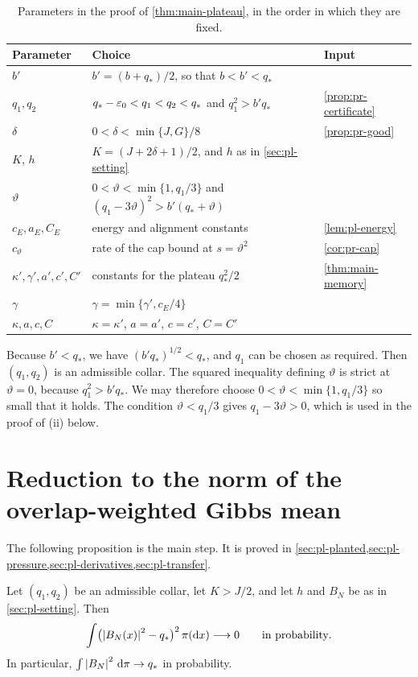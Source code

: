 \begin{table}[ht]
\centering
\small
\caption{Parameters in the proof of \cref{thm:main-plateau}, in the order in which they are fixed.}\label{tab:pl-parameters}
\begin{tabular}{@{}l l l@{}}
\toprule
Parameter & Choice & Input\\
\midrule
$b'$ & $b'=(b+q_*)/2$, so that $b<b'<q_*$ & \\
$q_1,q_2$ & $q_*-\varepsilon_0<q_1<q_2<q_*$ and $q_1^2>b'q_*$ & \cref{prop:pr-certificate}\\
$\delta$ & $0<\delta<\min\{J,G\}/8$ & \cref{prop:pr-good}\\
$K$, $h$ & $K=(J+2\delta+1)/2$, and $h$ as in \cref{sec:pl-setting} & \\
$\vartheta$ & $0<\vartheta<\min\{1,q_1/3\}$ and $(q_1-3\vartheta)^2>b'(q_*+\vartheta)$ & \\
$c_E,a_E,C_E$ & energy and alignment constants & \cref{lem:pl-energy}\\
$c_\vartheta$ & rate of the cap bound at $s=\vartheta^2$ & \cref{cor:pr-cap}\\
$\kappa',\gamma',a',c',C'$ & constants for the plateau $q_*^2/2$ & \cref{thm:main-memory}\\
$\gamma$ & $\gamma=\min\{\gamma',c_E/4\}$ & \\
$\kappa,a,c,C$ & $\kappa=\kappa'$, $a=a'$, $c=c'$, $C=C'$ & \\
\bottomrule
\end{tabular}
\end{table}

Because $b'<q_*$, we have $(b'q_*)^{1/2}<q_*$, and $q_1$ can be chosen as required. Then $(q_1,q_2)$ is an admissible collar. The squared inequality defining $\vartheta$ is strict at $\vartheta=0$, because $q_1^2>b'q_*$. We may therefore choose $0<\vartheta<\min\{1,q_1/3\}$ so small that it holds. The condition $\vartheta<q_1/3$ gives $q_1-3\vartheta>0$, which is used in the proof of (ii) below.


\section{Reduction to the norm of the overlap-weighted Gibbs mean}\label{sec:pl-reduction}

The following proposition is the main step. It is proved in \cref{sec:pl-planted,sec:pl-pressure,sec:pl-derivatives,sec:pl-transfer}.

\begin{proposition}\label{prop:pl-norm}
Let $(q_1,q_2)$ be an admissible collar, let $K>J/2$, and let $h$ and $B_N$ be as in \cref{sec:pl-setting}. Then
\[
\int\bigl(\left|B_N(x)\right|^2-q_*\bigr)^2\,\pi(\mathrm dx)\longrightarrow0\qquad\text{in probability}.
\]
In particular, $\int\left|B_N\right|^2\,\mathrm d\pi\to q_*$ in probability.
\end{proposition}

